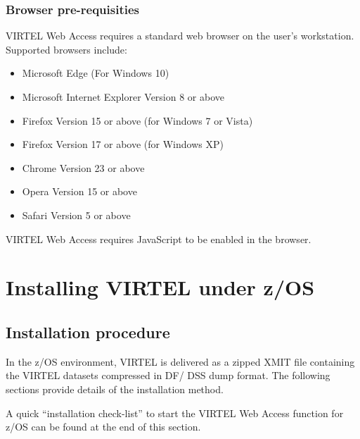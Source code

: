 \documentclass[letterpaper,10pt,english]{sphinxmanual}
\begin{document}
\subsection{Browser pre-requisities}
\label{\detokenize{Installation_Guide:index-2}}\label{\detokenize{Installation_Guide:browser-pre-requisities}}
VIRTEL Web Access requires a standard web browser on the user’s workstation. Supported browsers include:
\begin{itemize}
\item {} 
Microsoft Edge (For Windows 10)

\item {} 
Microsoft Internet Explorer Version 8 or above

\item {} 
Firefox Version 15 or above (for Windows 7 or Vista)

\item {} 
Firefox Version 17 or above (for Windows XP)

\item {} 
Chrome Version 23 or above

\item {} 
Opera Version 15 or above

\item {} 
Safari Version 5 or above

\end{itemize}

VIRTEL Web Access requires JavaScript to be enabled in the browser.
\label{\detokenize{Installation_Guide:v457ig-installz-os}}

\chapter{Installing VIRTEL under z/OS}
\label{\detokenize{Installation_Guide:installing-virtel-under-z-os}}\label{\detokenize{Installation_Guide:index-3}}

\section{Installation procedure}
\label{\detokenize{Installation_Guide:installation-procedure}}
In the z/OS environment, VIRTEL is delivered as a zipped XMIT file containing the VIRTEL datasets compressed in DF/ DSS dump format. The following sections provide details of the installation method.

A quick “installation check-list” to start the VIRTEL Web Access function for z/OS can be found at the end of this section.
\end{document}

